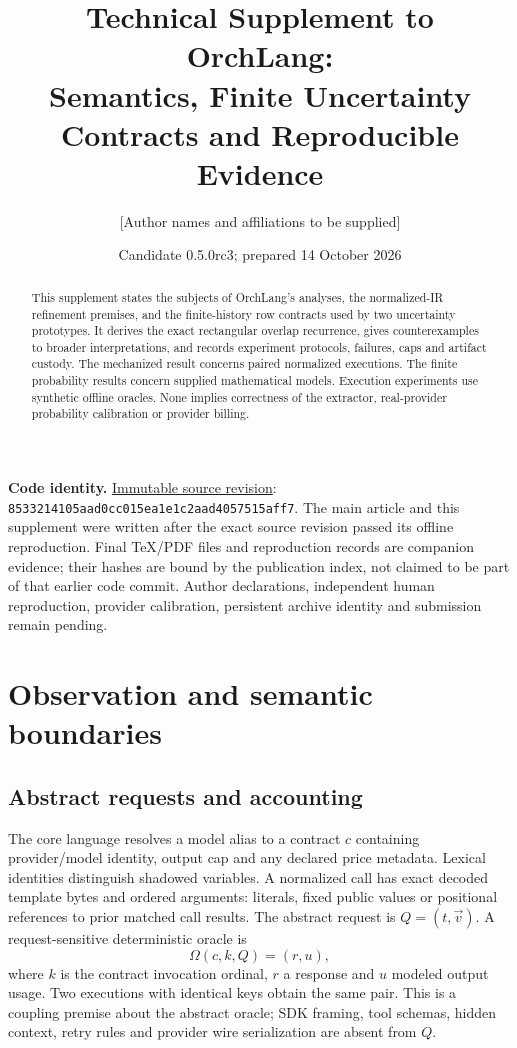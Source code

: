 \documentclass[11pt,a4paper]{article}
\title{Technical Supplement to OrchLang:\\Semantics, Finite Uncertainty Contracts and Reproducible Evidence}
\author{[Author names and affiliations to be supplied]}
\date{Candidate 0.5.0rc3; prepared 14 October 2026}
\newcommand{\SourceRevision}{8533214105aad0cc015ea1e1c2aad4057515aff7}
\newcommand{\Repo}{https://github.com/guyoverclocked/orchlang-compiler-design-project}
\begin{document}
\maketitle
\noindent\textbf{Code identity.} \href{\Repo/tree/\SourceRevision}{Immutable source revision}:\\
\texttt{\SourceRevision}. The main article and this supplement were written after the exact source revision passed its offline reproduction. Final TeX/PDF files and reproduction records are companion evidence; their hashes are bound by the publication index, not claimed to be part of that earlier code commit. Author declarations, independent human reproduction, provider calibration, persistent archive identity and submission remain pending.

\begin{abstract}
This supplement states the subjects of OrchLang's analyses, the normalized-IR refinement premises, and the finite-history row contracts used by two uncertainty prototypes. It derives the exact rectangular overlap recurrence, gives counterexamples to broader interpretations, and records experiment protocols, failures, caps and artifact custody. The mechanized result concerns paired normalized executions. The finite probability results concern supplied mathematical models. Execution experiments use synthetic offline oracles. None implies correctness of the extractor, real-provider probability calibration or provider billing.
\end{abstract}
\begingroup\small
\setcounter{tocdepth}{1}
\tableofcontents
\endgroup
\newpage

\section{Observation and semantic boundaries}
\subsection{Abstract requests and accounting}
The core language resolves a model alias to a contract $c$ containing provider/model identity, output cap and any declared price metadata. Lexical identities distinguish shadowed variables. A normalized call has exact decoded template bytes and ordered arguments: literals, fixed public values or positional references to prior matched call results. The abstract request is $Q=(t,\vec v)$. A request-sensitive deterministic oracle is
\[
\Omega(c,k,Q)=(r,u),
\]
where $k$ is the contract invocation ordinal, $r$ a response and $u$ modeled output usage. Two executions with identical keys obtain the same pair. This is a coupling premise about the abstract oracle; SDK framing, tool schemas, hidden context, retry rules and provider wire serialization are absent from $Q$.
\end{document}
